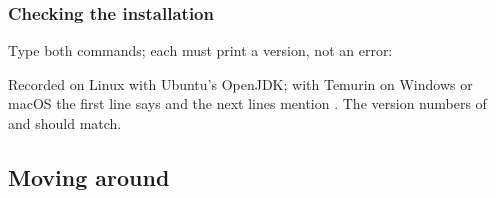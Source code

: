 \documentclass[aspectratio=169,10pt,compress]{beamer}
\begin{document}
\begin{frame}[t,fragile] \frametitle{Checking the installation}
  \small Type both commands; each must print a version, not an error:


  \vspace{0.1em}
  \small
  Recorded on Linux with Ubuntu's OpenJDK; with Temurin on Windows or macOS the first line says  and the
  next lines mention . The version numbers of  and  should match.
\end{frame}


\subsection[Moving]{Moving around}
\end{document}
